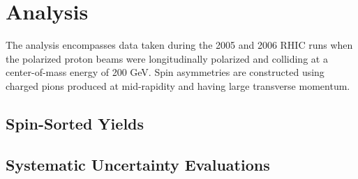 \chapter{Analysis}

The analysis encompasses data taken during the 2005 and 2006 RHIC runs when
the polarized proton beams were longitudinally polarized and colliding at a
center-of-mass energy of 200 GeV. Spin asymmetries are constructed using
charged pions produced at mid-rapidity and having large transverse momentum.




\section{Spin-Sorted Yields}

\section{Systematic Uncertainty Evaluations}
















